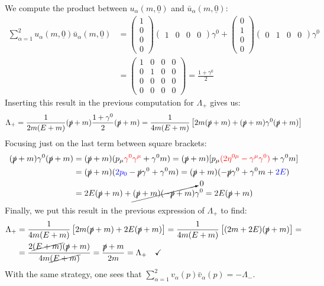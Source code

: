 \documentclass[../main.tex]{subfiles}
\begin{document}
We compute the product between $u_\alpha(m,\underline{0})$ and $\bar{u}_\alpha(m,\underline{0})$:
\begin{align*}
\sum_{\alpha=1}^2 u_\alpha(m,\underline{0})\bar{u}_\alpha(m,\underline{0})&=\left(\begin{array}{c}
   1 \\
   0 \\
   0 \\
   0
\end{array}\right)\left(\begin{array}{cccc}
1 & 0 & 0 & 0
\end{array}\right)\gamma^0+\left(\begin{array}{c}
   0 \\
   1 \\
   0 \\
   0
\end{array}\right)\left(\begin{array}{cccc}
0 & 1 & 0 & 0
\end{array}\right)\gamma^0\\
&=\left(\begin{array}{cccc}
    1 & 0 & 0 & 0 \\
    0 & 1 & 0 & 0 \\
    0 & 0 & 0 & 0 \\
    0 & 0 & 0 & 0 
\end{array}\right)=\frac{1+\gamma^0}{2}
\end{align*}
Inserting this result in the previous computation for $\Lambda_+$ gives us:
\[
\Lambda_+=\frac{1}{2m(E+m)}(\slashed{p}+m)\frac{1+\gamma^0}{2}(\slashed{p}+m)=\frac{1}{4m(E+m)}\left[2m(\slashed{p}+m)+(\slashed{p}+m)\gamma^0(\slashed{p}+m)\right]
\]
Focusing just on the last term between square brackets:
\begin{align*}
(\slashed{p}+m)\gamma^0(\slashed{p}+m)&=(\slashed{p}+m)(p_\mu{\color{red}\gamma^0\gamma^\mu}+\gamma^0m)=(\slashed{p}+m)[p_\mu{\color{red}(2\eta^{0\mu}-\gamma^\mu\gamma^0)}+\gamma^0m]\\
&=(\slashed{p}+m)({\color{blue}2p_0}-\slashed{p}\gamma^0+\gamma^0m)=(\slashed{p}+m)(-\slashed{p}\gamma^0+\gamma^0m+{\color{blue}2E})\\
&=2E(\slashed{p}+m)+\cancelto{0}{(\slashed{p}+m)(-\slashed{p}+m)}\gamma^0=2E(\slashed{p}+m)
\end{align*}
Finally, we put this result in the previous expression of $\Lambda_+$ to find:
\begin{align*}
\Lambda_+&=\frac{1}{4m(E+m)}\left[2m(\slashed{p}+m)+2E(\slashed{p}+m)\right]=\frac{1}{4m(E+m)}\left[(2m+2E)(\slashed{p}+m)\right]=\\
&=\frac{2\cancel{(E+m)}(\slashed{p}+m)}{4m\cancel{(E+m)}}=\frac{\slashed{p}+m}{2m}=\Lambda_+ \quad \checkmark
\end{align*}
With the same strategy, one sees that $\sum_{\alpha=1}^2v_\alpha(p)\bar{v}_\alpha(p)=-\Lambda_-$.
\end{document}
